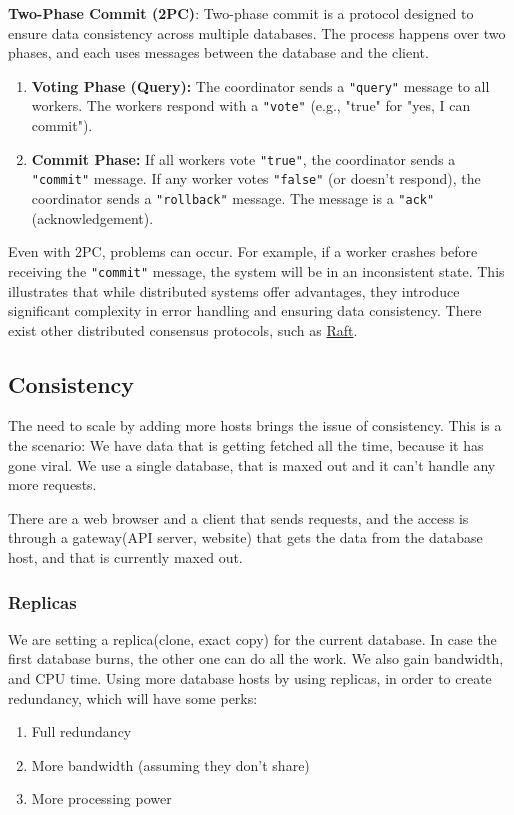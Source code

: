 \textbf{Two-Phase Commit (2PC)}: Two-phase commit is a protocol designed to ensure data consistency across multiple databases. The process happens over two phases, and each uses messages between the database and the client.
\begin{enumerate}[itemsep=1pt, topsep=2pt]
\item \textbf{Voting Phase (Query):} The coordinator sends a \texttt{"query"} message to all workers. The workers respond with a \texttt{"vote"} (e.g., "true" for "yes, I can commit").
\item \textbf{Commit Phase:} If all workers vote \texttt{"true"}, the coordinator sends a \texttt{"commit"} message. If any worker votes \texttt{"false"} (or doesn't respond), the coordinator sends a \texttt{"rollback"} message. The message is a \texttt{"ack"} (acknowledgement).
\end{enumerate}

Even with 2PC, problems can occur. For example, if a worker crashes before receiving the \texttt{"commit"} message, the system will be in an inconsistent state. This illustrates that while distributed systems offer advantages, they introduce significant complexity in error handling and ensuring data consistency.
There exist other distributed consensus protocols, such as \href{https://raft.github.io}{Raft}.


\subsection{Consistency}
The need to scale by adding more hosts brings the issue of consistency. This is a the scenario: We have data that is getting fetched all the time, because it has gone viral. We use a single database, that is maxed out and it can't handle any more requests.

There are a web browser and a client that sends requests, and the access is through a gateway(API server, website) that gets the data from the database host, and that is currently maxed out.

\subsubsection{Replicas}

We are setting a replica(clone, exact copy) for the current database. In case the first database burns, the other one can do all the work. We also gain bandwidth, and CPU time. Using more database hosts by using replicas, in order to create redundancy, which will have some perks:
\begin{enumerate}[label=\roman*), noitemsep, topsep=2pt]
\item Full redundancy
\item More bandwidth (assuming they don't share)
\item More processing power
\end{enumerate}

